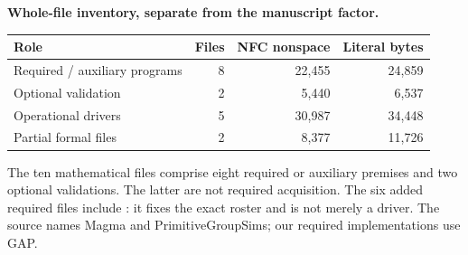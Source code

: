 \documentclass[11pt,a4paper]{article}
\begin{document}
\textbf{Whole-file inventory, separate from the manuscript factor.}
\begin{center}\small\begin{tabular}{lrrr}\toprule
Role & Files & NFC nonspace & Literal bytes\\\midrule
Required / auxiliary programs & 8 & 22,455 & 24,859\\
Optional validation & 2 & 5,440 & 6,537\\
Operational drivers & 5 & 30,987 & 34,448\\
Partial formal files & 2 & 8,377 & 11,726\\
\bottomrule\end{tabular}\end{center}
The ten mathematical files comprise eight required or auxiliary premises and two optional validations. The latter are not required acquisition. The six added required files include : it fixes the exact roster and is not merely a driver. The source names Magma and PrimitiveGroupSims; our required implementations use GAP.
\end{document}
